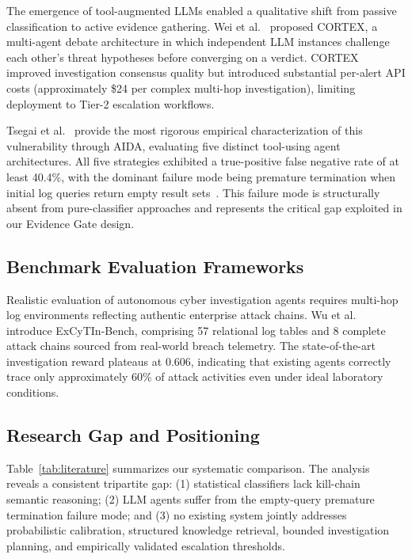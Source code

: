 The emergence of tool-augmented LLMs enabled a qualitative shift from passive
classification to active evidence gathering. Wei et al.~\cite{wei2025cortex}
proposed CORTEX, a multi-agent debate architecture in which independent LLM
instances challenge each other's threat hypotheses before converging on a verdict.
CORTEX improved investigation consensus quality but introduced substantial per-alert
API costs (approximately \$24 per complex multi-hop investigation), limiting
deployment to Tier-2 escalation workflows.

Tsegai et al.~\cite{tsegai2026aida} provide the most rigorous empirical characterization
of this vulnerability through AIDA, evaluating five distinct tool-using agent architectures.
All five strategies exhibited a true-positive false negative rate of at least 40.4\%, with
the dominant failure mode being premature termination when initial log queries return
empty result sets~\cite{tsegai2026aida_missing}. This failure mode is structurally absent
from pure-classifier approaches and represents the critical gap exploited in our Evidence Gate design.

\subsection{Benchmark Evaluation Frameworks}

Realistic evaluation of autonomous cyber investigation agents requires multi-hop log
environments reflecting authentic enterprise attack chains. Wu et al.~\cite{wu2026excytin}
introduce ExCyTIn-Bench, comprising 57 relational log tables and 8 complete attack
chains sourced from real-world breach telemetry. The state-of-the-art investigation
reward plateaus at 0.606, indicating that existing agents correctly trace only
approximately 60\% of attack activities even under ideal laboratory conditions.

\subsection{Research Gap and Positioning}

Table~\ref{tab:literature} summarizes our systematic comparison. The analysis reveals
a consistent tripartite gap: (1) statistical classifiers lack kill-chain semantic reasoning;
(2) LLM agents suffer from the empty-query premature termination failure mode; and
(3) no existing system jointly addresses probabilistic calibration, structured knowledge
retrieval, bounded investigation planning, and empirically validated escalation thresholds.

